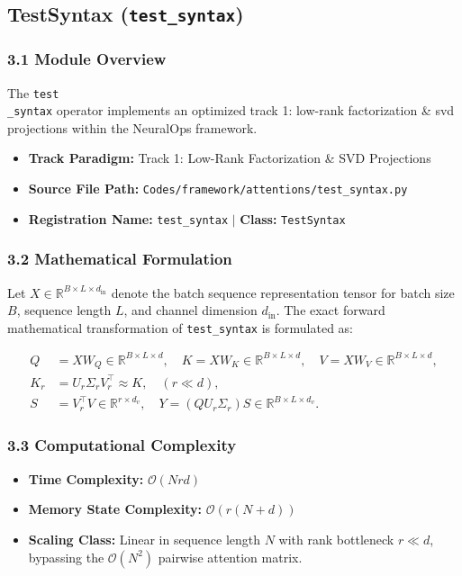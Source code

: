 \subsection{TestSyntax (\texttt{test\_syntax})}
\label{sec:app_module_test_syntax}

\subsubsection*{3.1 Module Overview}
The \texttt{test\\_syntax} operator implements an optimized track 1: low-rank factorization \& svd projections within the NeuralOps framework.
\begin{itemize}
    \item \textbf{Track Paradigm:} Track 1: Low-Rank Factorization & SVD Projections
    \item \textbf{Source File Path:} \texttt{Codes/framework/attentions/test\_syntax.py}
    \item \textbf{Registration Name:} \texttt{test\_syntax} $\mid$ \textbf{Class:} \texttt{TestSyntax}
\end{itemize}

\subsubsection*{3.2 Mathematical Formulation}
Let $X \in \mathbb{R}^{B \times L \times d_{\text{in}}}$ denote the batch sequence representation tensor for batch size $B$, sequence length $L$, and channel dimension $d_{\text{in}}$. The exact forward mathematical transformation of \texttt{test\_syntax} is formulated as:

\begin{align}
Q &= X W_Q \in \mathbb{R}^{B \times L \times d}, \quad K = X W_K \in \mathbb{R}^{B \times L \times d}, \quad V = X W_V \in \mathbb{R}^{B \times L \times d}, \\
K_r &= U_r \Sigma_r V_r^\top \approx K, \quad (r \ll d), \\
S &= V_r^\top V \in \mathbb{R}^{r \times d_v}, \quad Y = (Q U_r \Sigma_r) S \in \mathbb{R}^{B \times L \times d_v}.
\end{align}


\subsubsection*{3.3 Computational Complexity}
\begin{itemize}
    \item \textbf{Time Complexity:} $\mathcal{O}(N r d)$
    \item \textbf{Memory State Complexity:} $\mathcal{O}(r(N + d))$
    \item \textbf{Scaling Class:} Linear in sequence length $N$ with rank bottleneck $r \ll d$, bypassing the $\mathcal{O}(N^2)$ pairwise attention matrix.
\end{itemize}

